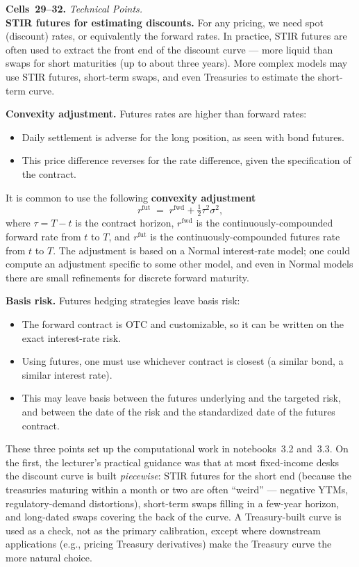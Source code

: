 \begin{keyblock}
\textbf{Cells~29--32.} \emph{Technical Points.}\\
\textbf{STIR futures for estimating discounts.} For any pricing, we need
spot (discount) rates, or equivalently the forward rates. In practice,
STIR futures are often used to extract the front end of the discount
curve --- more liquid than swaps for short maturities (up to about
three years). More complex models may use STIR futures, short-term swaps,
and even Treasuries to estimate the short-term curve.

\textbf{Convexity adjustment.} Futures rates are higher than forward
rates:
\begin{itemize}
  \item Daily settlement is adverse for the long position, as seen with
        bond futures.
  \item This price difference reverses for the rate difference, given the
        specification of the contract.
\end{itemize}
It is common to use the following \textbf{convexity adjustment}
\[
  r^{\text{fut}} \;=\; r^{\text{fwd}} + \tfrac{1}{2}\tau^2 \sigma^2,
\]
where $\tau = T-t$ is the contract horizon, $r^{\text{fwd}}$ is the
continuously-compounded forward rate from $t$ to $T$, and
$r^{\text{fut}}$ is the continuously-compounded futures rate from $t$ to
$T$. The adjustment is based on a Normal interest-rate model; one could
compute an adjustment specific to some other model, and even in Normal
models there are small refinements for discrete forward maturity.

\textbf{Basis risk.} Futures hedging strategies leave basis risk:
\begin{itemize}
  \item The forward contract is OTC and customizable, so it can be
        written on the exact interest-rate risk.
  \item Using futures, one must use whichever contract is closest (a
        similar bond, a similar interest rate).
  \item This may leave basis between the futures underlying and the
        targeted risk, and between the date of the risk and the
        standardized date of the futures contract.
\end{itemize}
\end{keyblock}

These three points set up the computational work in notebooks~3.2 and~3.3.
On the first, the lecturer's practical guidance was that at most
fixed-income desks the discount curve is built \emph{piecewise}: STIR
futures for the short end (because the treasuries maturing within a month
or two are often ``weird'' --- negative YTMs, regulatory-demand distortions),
short-term swaps filling in a few-year horizon, and long-dated swaps
covering the back of the curve. A Treasury-built curve is used as a check,
not as the primary calibration, except where downstream applications (e.g.,
pricing Treasury derivatives) make the Treasury curve the more natural
choice.

